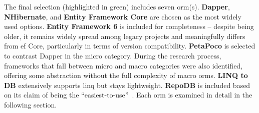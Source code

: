 The final selection (highlighted in green) includes seven \acrshort{orm}(s). \textbf{Dapper}, \textbf{NHibernate}, and \textbf{Entity Framework Core} are chosen as the most widely used options. \textbf{Entity Framework 6} is included for completeness -- despite being older, it remains widely spread among legacy projects and meaningfully differs from \acrshort{ef} Core, particularly in terms of version compatibility. \textbf{PetaPoco} is selected to contrast Dapper in the micro category. During the research process, frameworks that fall between micro and macro categories were also identified, offering some abstraction without the full complexity of macro \acrshort{orm}s. \textbf{LINQ to DB} extensively supports \acrshort{linq} but stays lightweight. \textbf{RepoDB} is included based on its claim of being the ``easiest-to-use''~\cite{RepoDB}. Each \acrshort{orm} is examined in detail in the following section.
